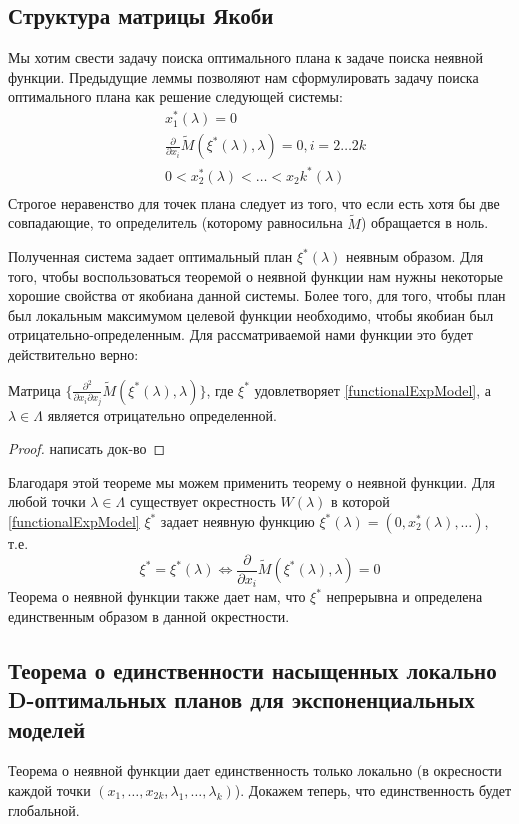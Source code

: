 \subsection{Структура матрицы Якоби}
Мы хотим свести задачу поиска оптимального плана к задаче поиска неявной функции. Предыдущие леммы позволяют нам сформулировать задачу поиска оптимального плана как решение следующей системы:
\begin{equation}
\label{functionalExpModel}
\begin{split}
&x_1^{*}(\lambda)=0 \\
&\frac{\partial}{\partial x_i}\tilde{M}(\xi^{*}(\lambda), \lambda) = 0, i = 2…2k \\
& 0 < x_2^{*}(\lambda) < … < x_2k^{*}(\lambda)\\
\end{split}
\end{equation}
Строгое неравенство для точек плана следует из того, что если есть хотя бы две совпадающие, то определитель (которому равносильна $\tilde{M}$) обращается в ноль. 

Полученная система задает оптимальный план $\xi^{*}(\lambda)$ неявным образом. Для того, чтобы воспользоваться теоремой о неявной функции нам нужны некоторые хорошие свойства от якобиана данной системы. Более того, для того, чтобы план был локальным максимумом целевой функции необходимо, чтобы  
якобиан был отрицательно-определенным. Для рассматриваемой нами функции это будет действительно верно:
\begin{thm}
Матрица $\{ \frac{\partial^2}{\partial x_i \partial x_j} \tilde{M}(\xi^{*}(\lambda), \lambda)\}$, где $\xi^{*}$ удовлетворяет \eqref{functionalExpModel}, а  $\lambda \in \Lambda$ является отрицательно определенной.
\end{thm}
\begin{proof}
написать док-во
\end{proof}

Благодаря этой теореме мы можем применить теорему о неявной функции. 
Для любой точки $\lambda \in \Lambda$ существует окрестность $W(\lambda)$  в которой \eqref{functionalExpModel} $\xi^{*}$ задает неявную функцию 
$\xi^{*}(\lambda)=(0, x_2^{*}(\lambda),…)$, т.е.  
$$\xi^{*} = \xi^{*}(\lambda) \Leftrightarrow \frac{\partial}{\partial x_i}\tilde{M}(\xi^{*}(\lambda), \lambda)=0$$
Теорема о неявной функции также дает нам, что $\xi^{*}$ непрерывна и определена единственным образом в данной окрестности.


\subsection{Теорема о единственности насыщенных локально D-оптимальных планов для экспоненциальных моделей}
Теорема о неявной функции дает единственность только локально (в окресности каждой точки $(x_1, …, x_{2k}, \lambda_1,…,\lambda_{k})$). Докажем теперь, что единственность будет глобальной.

